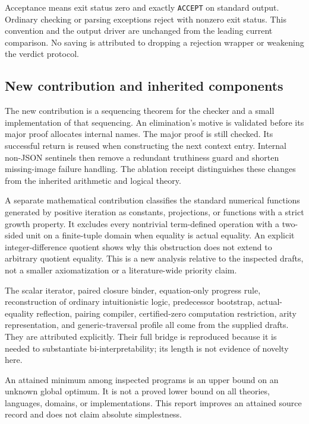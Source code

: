 \documentclass[11pt,letterpaper]{article}
\theoremstyle{definition}\newtheorem{definition}[theorem]{Definition}
\theoremstyle{remark}\newtheorem{remark}[theorem]{Remark}
\begin{document}
Acceptance means exit status zero and exactly \texttt{ACCEPT} on standard
output. Ordinary checking or parsing exceptions reject with nonzero exit
status. This convention and the output driver are unchanged from the
leading current comparison. No saving is attributed to dropping a
rejection wrapper or weakening the verdict protocol.

\subsection{New contribution and inherited components}

The new contribution is a sequencing theorem for the checker and a
small implementation of that sequencing. An elimination's motive is
validated before its major proof allocates internal names. The major
proof is still checked. Its successful return is reused when constructing
the next context entry. Internal non-JSON sentinels then remove a
redundant truthiness guard and shorten missing-image failure handling.
The ablation receipt distinguishes these changes from the inherited
arithmetic and logical theory.

A separate mathematical contribution classifies the standard numerical
functions generated by positive iteration as constants, projections, or
functions with a strict growth property. It excludes every nontrivial
term-defined operation with a two-sided unit on a finite-tuple domain
when equality is actual equality. An explicit integer-difference quotient
shows why this obstruction does not extend to arbitrary quotient equality.
This is a new analysis relative to the inspected drafts, not a smaller
axiomatization or a literature-wide priority claim.

The scalar iterator, paired closure binder, equation-only progress rule,
reconstruction of ordinary intuitionistic logic, predecessor bootstrap,
actual-equality reflection, pairing compiler, certified-zero computation
restriction, arity representation, and generic-traversal profile all
come from the supplied drafts. They are attributed explicitly. Their
full bridge is reproduced because it is needed to substantiate
bi-interpretability; its length is not evidence of novelty here.

An attained minimum among inspected programs is an upper bound on an
unknown global optimum. It is not a proved lower bound on all theories,
languages, domains, or implementations. This report improves an attained
source record and does not claim absolute simplestness.
\end{document}
